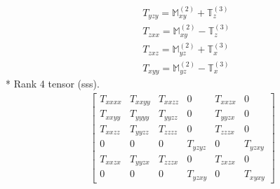 \documentclass[fleqn,8pt,landscape]{jsarticle}
\begin{document}
\begin{align*}
& T_{yzy} = \mathbb{M}_{xy}^{(2)} + \mathbb{T}_{z}^{(3)} \\
& T_{zxx} = \mathbb{M}_{xy}^{(2)} - \mathbb{T}_{z}^{(3)} \\
& T_{zxz} = \mathbb{M}_{yz}^{(2)} + \mathbb{T}_{x}^{(3)} \\
& T_{xyy} = \mathbb{M}_{yz}^{(2)} - \mathbb{T}_{x}^{(3)}
\end{align*}
* Rank 4 tensor (sss).
\begin{align*}
\begin{bmatrix} T_{xxxx} & T_{xxyy} & T_{xxzz} & 0 & T_{xxzx} & 0 \\ T_{xxyy} & T_{yyyy} & T_{yyzz} & 0 & T_{yyzx} & 0 \\ T_{xxzz} & T_{yyzz} & T_{zzzz} & 0 & T_{zzzx} & 0 \\ 0 & 0 & 0 & T_{yzyz} & 0 & T_{yzxy} \\ T_{xxzx} & T_{yyzx} & T_{zzzx} & 0 & T_{zxzx} & 0 \\ 0 & 0 & 0 & T_{yzxy} & 0 & T_{xyxy} \end{bmatrix}
\end{align*}
\end{document}
